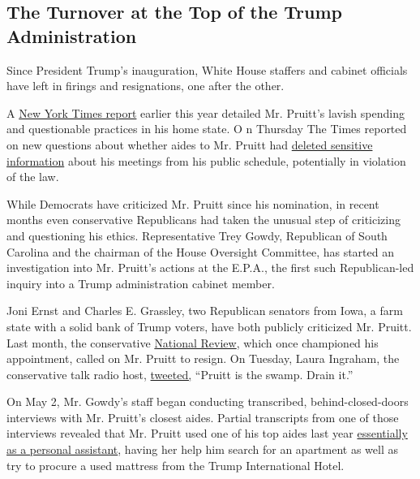 \hypertarget{the-turnover-at-the-top-of-the-trump-administration}{%
\subsection{The Turnover at the Top of the Trump
Administration}\label{the-turnover-at-the-top-of-the-trump-administration}}

Since President Trump's inauguration, White House staffers and cabinet
officials have left in firings and resignations, one after the other.

A
\href{https://www.nytimes.com/2018/04/21/us/politics/scott-pruitt-oklahoma-epa.html}{New
York Times report} earlier this year detailed Mr. Pruitt's lavish
spending and questionable practices in his home state. O n Thursday The
Times reported on new questions about whether aides to Mr. Pruitt had
\href{https://www.nytimes.com/2018/07/05/climate/pruitt-epa-calendar-morris.html}{deleted
sensitive information} about his meetings from his public schedule,
potentially in violation of the law.

While Democrats have criticized Mr. Pruitt since his nomination, in
recent months even conservative Republicans had taken the unusual step
of criticizing and questioning his ethics. Representative Trey Gowdy,
Republican of South Carolina and the chairman of the House Oversight
Committee, has started an investigation into Mr. Pruitt's actions at the
E.P.A., the first such Republican-led inquiry into a Trump
administration cabinet member.

Joni Ernst and Charles E. Grassley, two Republican senators from Iowa, a
farm state with a solid bank of Trump voters, have both publicly
criticized Mr. Pruitt. Last month, the conservative
\href{https://www.nationalreview.com/2018/06/scott-pruitt-should-resign/}{National
Review}, which once championed his appointment, called on Mr. Pruitt to
resign. On Tuesday, Laura Ingraham, the conservative talk radio host,
\href{https://twitter.com/IngrahamAngle/status/1014281388269408257}{tweeted,}
``Pruitt is the swamp. Drain it.''

On May 2, Mr. Gowdy's staff began conducting transcribed,
behind-closed-doors interviews with Mr. Pruitt's closest aides. Partial
transcripts from one of those interviews revealed that Mr. Pruitt used
one of his top aides last year
\href{https://www.nytimes.com/2018/06/04/climate/pruitt-epa-apartment-aide.html}{essentially
as a personal assistant}, having her help him search for an apartment as
well as try to procure a used mattress from the Trump International
Hotel.

